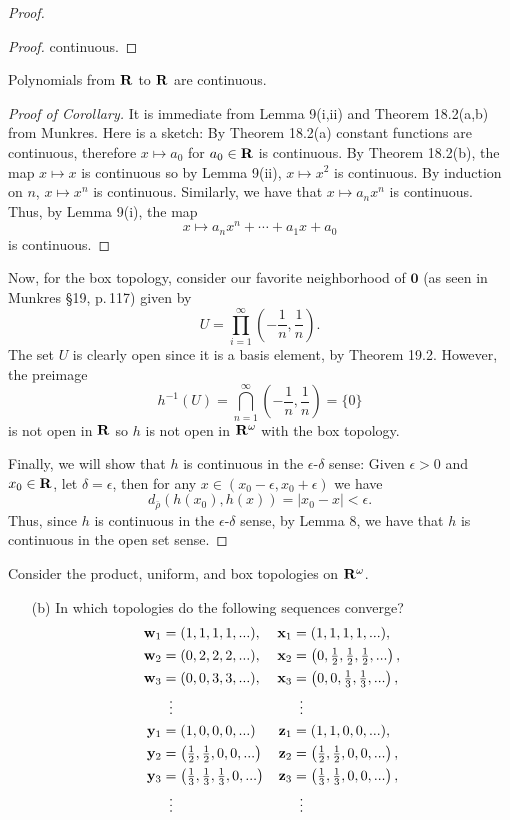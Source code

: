 \begin{proof}
\begin{proof}
continuous.
\end{proof}
\begin{corollary*}
Polynomials from $\mathbf{R}$ to $\mathbf{R}$ are continuous.
\end{corollary*}
\begin{proof}[Proof of Corollary]
\renewcommand\qedsymbol{$\clubsuit$}
It is immediate from Lemma 9(i,ii) and Theorem 18.2(a,b) from
Munkres. Here is a sketch: By Theorem 18.2(a) constant functions
are continuous, therefore $x\mapsto a_0$ for $a_0\in\mathbf{R}$ is
continuous. By Theorem 18.2(b), the map $x\mapsto x$ is
continuous so by Lemma 9(ii), $x\mapsto x^2$ is continuous. By
induction on $n$, $x\mapsto x^n$ is continuous. Similarly, we
have that $x\mapsto a_nx^n$ is continuous. Thus, by Lemma 9(i),
the map
\[
x\longmapsto a_nx^n+\cdots+a_1x+a_0
\]
is continuous.
\end{proof}
Now, for the box topology, consider our favorite neighborhood of
$\mathbf{0}$ (as seen in Munkres \S19, p.\,117) given by
\[
U=\prod_{i=1}^\infty\left(-\frac{1}{n},\frac{1}{n}\right).
\]
The set $U$ is clearly open since it is a basis element, by
Theorem 19.2. However, the preimage
\[
h^{-1}(U)=\bigcap_{n=1}^\infty\left(-\frac{1}{n},\frac{1}{n}\right)=\{0\}
\]
is not open in $\mathbf{R}$ so $h$ is not open in $\mathbf{R}^\omega$ with the
box topology.

Finally, we will show that $h$ is continuous in the
$\epsilon$-$\delta$ sense: Given $\epsilon>0$ and $x_0\in\mathbf{R}$,
let $\delta=\epsilon$, then for any
$x\in(x_0-\epsilon,x_0+\epsilon)$ we have
\[
d_{\bar\rho}\left(h(x_0),h(x)\right)
=|x_0-x|<\epsilon.
\]
Thus, since $h$ is continuous in the $\epsilon$-$\delta$ sense,
by Lemma 8, we have that $h$ is continuous in the open set sense.
\end{proof}
\newpage
\begin{problem}[Munkres \S20, Ex.\,4(b)]
Consider the product, uniform, and box topologies on
$\mathbf{R}^\omega$.
\begin{enumerate}[noitemsep]
\item[(b)] In which topologies do the following sequences
  converge?
\begin{align*}
\mathbf{w}_1&=(1,1,1,1,...),&\mathbf{x}_1&=(1,1,1,1,...),\\
\mathbf{w}_2&=(0,2,2,2,...),&\mathbf{x}_2&=\left(0,\tfrac{1}{2},\tfrac{1}{2},\tfrac{1}{2},...\right),\\
\mathbf{w}_3&=(0,0,3,3,...),&\mathbf{x}_3&=\left(0,0,\tfrac{1}{3},\tfrac{1}{3},...\right),\\
&\vdotswithin{=}&&\vdotswithin{=}\\
\mathbf{y}_1&=(1,0,0,0,...)&\mathbf{z}_1&=(1,1,0,0,...),\\
\mathbf{y}_2&=\left(\tfrac{1}{2},\tfrac{1}{2},0,0,...\right)&\mathbf{z}_2&=\left(\tfrac{1}{2},\tfrac{1}{2},0,0,...\right),\\
\mathbf{y}_3&=\left(\tfrac{1}{3},\tfrac{1}{3},\tfrac{1}{3},0,...\right)&\mathbf{z}_3&=\left(\tfrac{1}{3},\tfrac{1}{3},0,0,...\right),\\
&\vdotswithin{=}&&\vdotswithin{=}
\end{align*}
\end{enumerate}
\end{problem}

